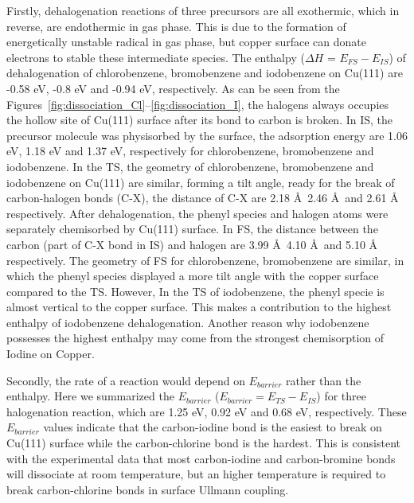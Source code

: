 \documentclass[%
 reprint,
 amsmath,amssymb,
 aps,
prb,
]{revtex4-1}
\begin{document}
Firstly, dehalogenation reactions of three precursors are all exothermic, which in reverse, are endothermic in gas phase. This is due to the formation of energetically unstable radical in gas phase, but copper surface can donate electrons to stable these intermediate species.
The enthalpy ($\Delta H$ = $E_{FS} - E_{IS}$) of dehalogenation of chlorobenzene, bromobenzene and iodobenzene on Cu(111) are -0.58 eV, -0.8 eV and -0.94 eV, respectively. As can be seen from the Figures~\ref{fig:dissociation_Cl}--\ref{fig:dissociation_I}, the halogens always occupies the hollow site of Cu(111) surface after its bond to carbon is broken. 
In IS, the precursor molecule was physisorbed by the surface, the adsorption energy are 1.06 eV, 1.18 eV and 1.37 eV, respectively for chlorobenzene, bromobenzene and iodobenzene. 
%
In the TS, the geometry of chlorobenzene, bromobenzene and iodobenzene on Cu(111) are similar, forming a tilt angle, ready for the break of carbon-halogen bonds (C-X), the distance of C-X are 2.18 \AA\, 2.46 \AA\ and 2.61 \AA\, respectively. 
After dehalogenation, the phenyl species and halogen atoms were separately chemisorbed by Cu(111) surface. In FS, the distance between the carbon (part of C-X bond in IS) and halogen are 3.99 \AA\, 4.10 \AA\ and 5.10 \AA\, respectively. The geometry of FS for chlorobenzene, bromobenzene are similar, in which the phenyl species displayed a more tilt angle with the copper surface compared to the TS. 
However, In the TS of iodobenzene, the phenyl specie is almost vertical to the copper surface. This makes a contribution to the highest enthalpy of iodobenzene dehalogenation. Another reason why iodobenzene possesses the highest enthalpy may come from the strongest chemisorption of Iodine on Copper. 

Secondly, the rate of a reaction would depend on $E_{barrier}$ rather than the enthalpy. Here we summarized the $E_{barrier}$ ($E_{barrier} = E_{TS} - E_{IS}$) for three halogenation reaction, which are 1.25 eV, 0.92 eV and 0.68 eV, respectively. These $E_{barrier}$ values indicate that the carbon-iodine bond is the easiest to break on Cu(111) surface while the carbon-chlorine bond is the hardest. This is consistent with the experimental data that most carbon-iodine and carbon-bromine bonds will dissociate at room temperature, but an higher temperature is required to break carbon-chlorine bonds in surface Ullmann coupling.
\end{document}

